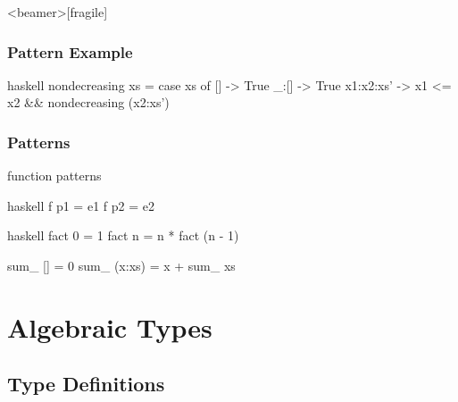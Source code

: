 \documentclass[dvipsnames]{beamer}
\theoremstyle{plain}
\begin{document}
\begin{frame}<beamer>[fragile]
  \frametitle{Pattern Example}

  \begin{example}
    \begin{pygments}{haskell}
nondecreasing xs =
    case xs of
      [] -> True
      _:[] -> True
      x1:x2:xs' -> x1 <= x2 && nondecreasing (x2:xs')
    \end{pygments}
  \end{example}
\end{frame}

\begin{frame}[fragile]
  \frametitle{Patterns}

  \begin{block}{function patterns}
    \begin{pygments}{haskell}
f p1 = e1
f p2 = e2
    \end{pygments}
  \end{block}

  \pause
  \begin{example}[factorial]
    \begin{pygments}{haskell}
fact 0 = 1
fact n = n * fact (n - 1)

sum_ [] = 0
sum_ (x:xs) = x + sum_ xs
    \end{pygments}
  \end{example}
\end{frame}

\section{Algebraic Types}

\subsection{Type Definitions}
\end{document}
